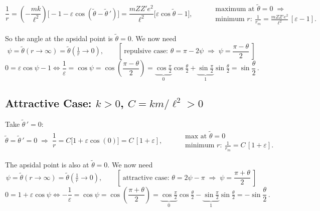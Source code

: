 \documentclass[11pt]{article}
\newcommand{\half}[1]{\tfrac{#1}{2}}
\begin{document}
\begin{equation}
\frac{1}{r} = \left(-\frac{mk}{\ell^{2}}\right)
   \bigl[-1 - \varepsilon\cos(\tilde\theta-\tilde\theta\,')\bigr]
 = \frac{m Z Z' e^{2}}{\ell^{2}}\bigl[\varepsilon\cos\tilde\theta - 1\bigr],
\qquad
\begin{aligned}
&\text{maximum at } \tilde\theta = 0 \;\Rightarrow\\
&\text{minimum } r:\ \frac{1}{r_{m}} = \frac{m Z Z' e^{2}}{\ell^{2}}\,[\varepsilon-1].
\end{aligned}
\end{equation}

So the angle at the apsidal point is $\tilde\theta = 0$. We now need
\begin{equation}
\psi = \tilde\theta(r\to\infty) = \tilde\theta\!\left(\tfrac{1}{r}\to 0\right),
\qquad
\left[\ \text{repulsive case: } \theta = \pi - 2\psi
 \;\Rightarrow\; \psi = \frac{\pi-\theta}{2}\ \right]
\end{equation}
\begin{equation}
0 = \varepsilon\cos\psi - 1
\iff \frac{1}{\varepsilon} = \cos\psi = \cos\!\left(\frac{\pi-\theta}{2}\right)
 = \underbrace{\cos\half{\pi}}_{0}\cos\half{\theta}
 + \underbrace{\sin\half{\pi}}_{1}\sin\half{\theta}
 = \sin\frac{\theta}{2}\,.
\label{eq:rep-sinhalf}
\end{equation}

\subsection{Attractive Case: \texorpdfstring{$k>0$}{k>0}, \texorpdfstring{$C=km/\ell^2>0$}{C=km/l2>0}}

Take $\tilde\theta\,' = 0$:
\begin{equation}
\tilde\theta = \tilde\theta\,' = 0 \;\Rightarrow\;
\frac{1}{r} = C\bigl[1 + \varepsilon\cos(0)\bigr] = C\,[1+\varepsilon],
\qquad
\begin{aligned}
&\text{max at } \tilde\theta = 0\\
&\text{minimum } r:\ \frac{1}{r_{m}} = C\,[1+\varepsilon].
\end{aligned}
\end{equation}

The apsidal point is also at $\tilde\theta = 0$. We now need
\begin{equation}
\psi = \tilde\theta(r\to\infty) = \tilde\theta\!\left(\tfrac{1}{r}\to 0\right),
\qquad
\left[\ \text{attractive case: } \theta = 2\psi - \pi
 \;\Rightarrow\; \psi = \frac{\pi+\theta}{2}\ \right]
\end{equation}
\begin{equation}
0 = 1 + \varepsilon\cos\psi
\iff -\frac{1}{\varepsilon} = \cos\psi = \cos\!\left(\frac{\pi+\theta}{2}\right)
 = \underbrace{\cos\half{\pi}}_{0}\cos\half{\theta}
 - \underbrace{\sin\half{\pi}}_{1}\sin\half{\theta}
 = -\sin\frac{\theta}{2}\,.
\label{eq:att-sinhalf}
\end{equation}
\end{document}
